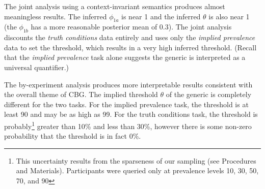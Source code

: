 \documentclass[10pt,letterpaper]{article}
\newcommand{\red}[1]{\textcolor{Red}{#1}}
\begin{document}

%

%
%	
%		
%			






The joint analysis using a context-invariant semantics produces almost meaningless results. The inferred $\phi_{1a}$ is near 1 and the inferred $\theta$ is also near 1 (the $\phi_{1b}$ has a more reasonable posterior mean of 0.3). The joint analysis discounts the \emph{truth conditions} data entirely and uses only the \emph{implied prevalence} data to set the threshold, which results in a very high inferred threshold. (Recall that the \emph{implied prevalence} task alone suggests the generic is interpreted as a universal quantifier.)

The by-experiment analysis produces more interpretable results consistent with the overall theme of CBG. The implied threshold $\theta$ of the generic is completely different for the two tasks. For the implied prevalence task, the threshold is at least 90 and may be as high as 99. For the truth conditions task, the threshold is probably\footnote{This uncertainty results from the sparseness of our sampling (see Procedures and Materials). Participants were queried only at prevalence levels 10, 30, 50, 70, and 90} greater than 10\% and less than 30\%, however there is some non-zero probability that the threshold is in fact 0\%. 
\end{document}

